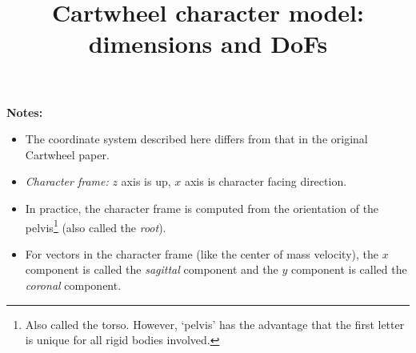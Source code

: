 \documentclass[a4paper]{article}
\title{Cartwheel character model: dimensions and DoFs}
\begin{document}



\pgfmathsetmacro{\shankSizeZ}{\legSizeZ * \kneeRelativePosZ}
\pgfmathsetmacro{\thighSizeZ}{\legSizeZ - \shankSizeZ}

\pgfmathsetmacro{\anklePosZ}{\footSizeZ}
\pgfmathsetmacro{\kneePosZ}{\anklePosZ + \legSizeZ * \kneeRelativePosZ}
\pgfmathsetmacro{\hipPosZ}{\anklePosZ + \legSizeZ}


\maketitle
\textbf{Notes:}
\begin{itemize}
\item The coordinate system described here differs from that in the original Cartwheel paper.
\item \textit{Character frame:} $z$ axis is up, $x$ axis is character facing direction.
\item In practice, the character frame is computed from the orientation of the pelvis\footnote{Also called the torso. However, `pelvis' has the advantage that the first letter is unique for all rigid bodies involved.} (also called the \textit{root}).
\item For vectors in the character frame (like the center of mass velocity), the $x$ component is called the \textit{sagittal} component and the $y$ component is called the \textit{coronal} component.
\end{itemize}
\end{document}
